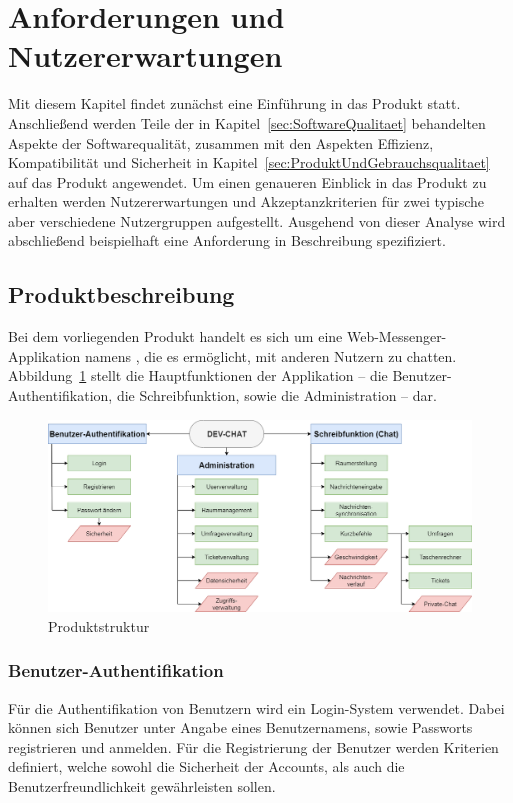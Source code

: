 \section{Anforderungen und Nutzererwartungen}
Mit diesem Kapitel findet zunächst eine Einführung in das Produkt  statt.
Anschließend werden Teile der in Kapitel~\ref{sec:SoftwareQualitaet} behandelten Aspekte der Softwarequalität, zusammen mit den Aspekten Effizienz, Kompatibilität und Sicherheit in Kapitel~\ref{sec:ProduktUndGebrauchsqualitaet} auf das Produkt angewendet.
\newparagraph
Um einen genaueren Einblick in das Produkt zu erhalten werden Nutzererwartungen und Akzeptanzkriterien für zwei typische aber verschiedene Nutzergruppen aufgestellt.
Ausgehend von dieser Analyse wird abschließend beispielhaft eine Anforderung in  Beschreibung spezifiziert.

\subsection{Produktbeschreibung}
Bei dem vorliegenden Produkt handelt es sich um eine Web-Messenger-Applikation namens , die es ermöglicht, mit anderen Nutzern zu chatten.
Abbildung~\ref{fig:Produktstruktur} stellt die Hauptfunktionen der Applikation -- die Benutzer-Authentifikation, die Schreibfunktion, sowie die Administration -- dar.
\begin{figure}[H]
  \centering
  \includegraphics[width=1\textwidth, keepaspectratio]{images/Produktstruktur.png}
  \caption{Produktstruktur}
  \label{fig:Produktstruktur}
\end{figure}

\subsubsection{Benutzer-Authentifikation}\label{sec:BenutzerAuthentifikation}
Für die Authentifikation von Benutzern wird ein Login-System verwendet.
Dabei können sich Benutzer unter Angabe eines Benutzernamens, sowie Passworts registrieren und anmelden.
Für die Registrierung der Benutzer werden Kriterien definiert, welche sowohl die Sicherheit der Accounts, als auch die Benutzerfreundlichkeit gewährleisten sollen.

